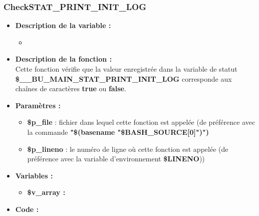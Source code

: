 \documentclass[a4paper,10pt]{article}
\begin{document}
\color{blue}
\subsubsection{CheckSTAT\_PRINT\_INIT\_LOG}\color{white}
\begin{itemize}
    \item \textbf{Description de la variable :}
    \begin{itemize}
        \item \textbf{}\\[1\baselineskip]
    \end{itemize}


    \item \textbf{Description de la fonction :}\\
        Cette fonction vérifie que la valeur enregistrée dans la variable de statut\\ \textbf{\color{orange}\$\_\_BU\_MAIN\_STAT\_PRINT\_INIT\_LOG} corresponde aux chaînes de caractères \textbf{true} ou \textbf{false}.\\[1\baselineskip]

    \item \textbf{Paramètres :}
    \begin{itemize}
        \item \color{orange}\textbf{\$p\_file}\color{white} : fichier dans lequel cette fonction est appelée (de préférence avec la commande \textbf{"\$(\color{gray}basename \color{white}"\color{orange}\$BASH\_SOURCE[0]\color{white}")")}\\[1\baselineskip]

        \item \color{orange}\textbf{\$p\_lineno}\color{white} : le numéro de ligne où cette fonction est appelée (de préférence avec la variable d'environnement \textbf{\color{orange}\$LINENO}))\\[1\baselineskip]
    \end{itemize}

    \item \textbf{Variables :}
    \begin{itemize}
        \item \textbf{\color{orange}\$v\_array\color{white} :}\\[1\baselineskip]
    \end{itemize}


    \item \textbf{Code :}
\end{itemize}
\end{document}
